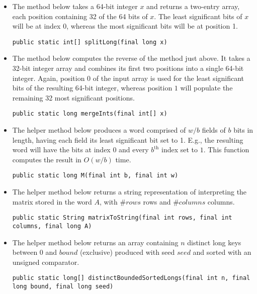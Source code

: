 \begin{itemize}
    \item
    The method below takes a 64-bit integer $x$ and returns a two-entry array, each position containing 32 of the 64 bits of $x$. The least significant bits of $x$ will be at index 0, whereas the most significant bits will be at position 1.
    \begin{lstlisting}
public static int[] splitLong(final long x)
    \end{lstlisting}
    
    \item
    The method below computes the reverse of the method just above. It takes a 32-bit integer array and combines its first two positions into a single 64-bit integer. Again, position 0 of the input array is used for the least significant bits of the resulting 64-bit integer, whereas position $1$ will populate the remaining 32 most significant positions.
    \begin{lstlisting}
public static long mergeInts(final int[] x)
    \end{lstlisting}
    
    \item
    The helper method below produces a word comprised of $w / b$ fields of $b$ bits in length, having each field its least significant bit set to 1. E.g., the resulting word will have the bits at index $0$ and every $b^{\text{th}}$ index set to $1$. This function computes the result in $O(w/b)$ time.
    \begin{lstlisting}
public static long M(final int b, final int w)
    \end{lstlisting}

    \item
    The helper method below returns a string representation of interpreting the matrix stored in the word $A$, with $\#rows$ rows and $\#columns$ columns.
    \begin{lstlisting}
public static String matrixToString(final int rows, final int columns, final long A)
    \end{lstlisting}
    
    \item
    The helper method below returns an array containing $n$ distinct {\ttfamily long} keys between 0 and $bound$ (exclusive) produced with seed $seed$ and sorted with an unsigned comparator.
    \begin{lstlisting}
public static long[] distinctBoundedSortedLongs(final int n, final long bound, final long seed)
    \end{lstlisting}
    

\end{itemize}
